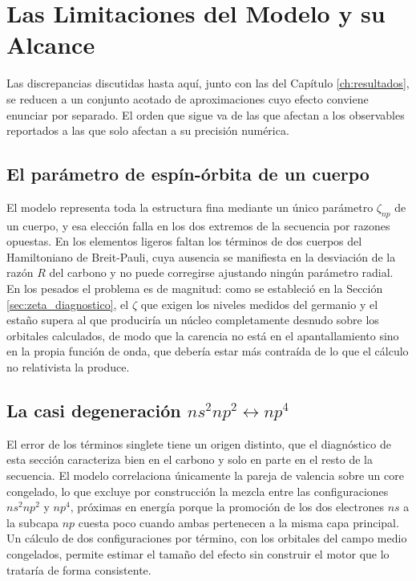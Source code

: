 \section{Las Limitaciones del Modelo y su Alcance}

Las discrepancias discutidas hasta aquí, junto con las del Capítulo \ref{ch:resultados}, se reducen a un conjunto acotado de aproximaciones cuyo efecto conviene enunciar por separado. El orden que sigue va de las que afectan a los observables reportados a las que solo afectan a su precisión numérica.

\subsection{El parámetro de espín-órbita de un cuerpo}

El modelo representa toda la estructura fina mediante un único parámetro $\zeta_{np}$ de un cuerpo, y esa elección falla en los dos extremos de la secuencia por razones opuestas. En los elementos ligeros faltan los términos de dos cuerpos del Hamiltoniano de Breit-Pauli, cuya ausencia se manifiesta en la desviación de la razón $R$ del carbono y no puede corregirse ajustando ningún parámetro radial. En los pesados el problema es de magnitud: como se estableció en la Sección \ref{sec:zeta_diagnostico}, el $\zeta$ que exigen los niveles medidos del germanio y el estaño supera al que produciría un núcleo completamente desnudo sobre los orbitales calculados, de modo que la carencia no está en el apantallamiento sino en la propia función de onda, que debería estar más contraída de lo que el cálculo no relativista la produce.

\subsection{La casi degeneración \texorpdfstring{$ns^2np^2 \leftrightarrow np^4$}{ns2np2 <-> np4}}

El error de los términos singlete tiene un origen distinto, que el diagnóstico de esta sección caracteriza bien en el carbono y solo en parte en el resto de la secuencia. El modelo correlaciona únicamente la pareja de valencia sobre un core congelado, lo que excluye por construcción la mezcla entre las configuraciones $ns^2np^2$ y $np^4$, próximas en energía porque la promoción de los dos electrones $ns$ a la subcapa $np$ cuesta poco cuando ambas pertenecen a la misma capa principal. Un cálculo de dos configuraciones por término, con los orbitales del campo medio congelados, permite estimar el tamaño del efecto sin construir el motor que lo trataría de forma consistente.

